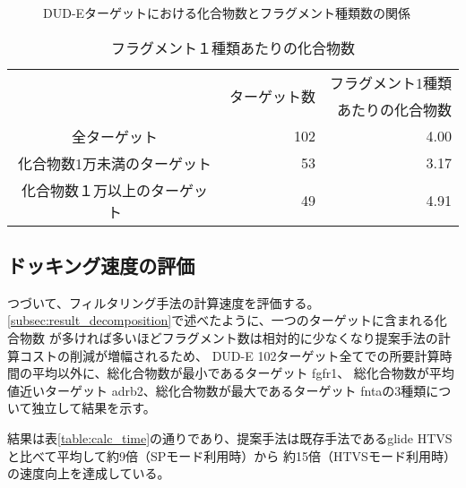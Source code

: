 \begin{figure}[bhtp]
 \begin{center}
  \caption{DUD-Eターゲットにおける化合物数とフラグメント種類数の関係}
  \label{fig:dude_decomposition}
 \end{center}
\end{figure}
\begin{table}[htb] \centering
	\caption{フラグメント１種類あたりの化合物数}
	\label{table:dude_decomposition}
	\begin{tabular}{c|rr}
	\hline
								&\multirow{2}{*}{ターゲット数}	&フラグメント1種類		\\
								&						&あたりの化合物数		\\ \hline
	全ターゲット					&102		&4.00							\\
	化合物数1万未満のターゲット		&53			&3.17							\\
	化合物数１万以上のターゲット	&49			&4.91							\\ \hline
	\end{tabular}
\end{table}


\subsection{ドッキング速度の評価}\label{subsec:single_calc_time}
つづいて、フィルタリング手法の計算速度を評価する。\ref{subsec:result_decomposition}で述べたように、一つのターゲットに含まれる化合物数
が多ければ多いほどフラグメント数は相対的に少なくなり提案手法の計算コストの削減が増幅されるため、
DUD-E 102ターゲット全てでの所要計算時間の平均以外に、総化合物数が最小であるターゲット fgfr1、
総化合物数が平均値近いターゲット adrb2、総化合物数が最大であるターゲット fntaの3種類について独立して結果を示す。

結果は表\ref{table:calc_time}の通りであり、提案手法は既存手法であるglide HTVSと比べて平均して約9倍（SPモード利用時）から
約15倍（HTVSモード利用時）の速度向上を達成している。

